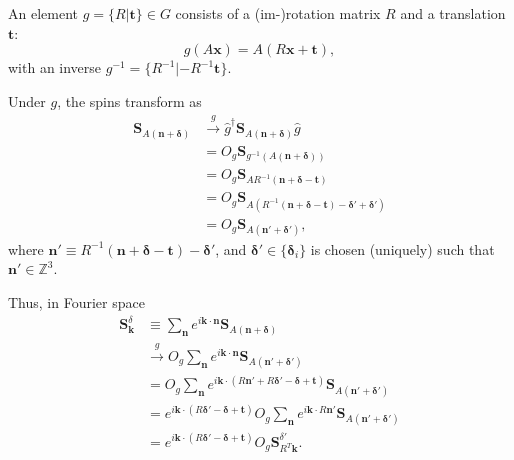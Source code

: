 \documentclass[12pt, a4paper]{article}
\begin{document}
An element $g=\{R|\bm{t}\}\in G$ consists of a (im-)\@proper rotation matrix $R$ and a translation $\bm{t}$:
\begin{equation}
  g(A\bm{x})=A(R\bm{x}+\bm{t}),
\end{equation}
with an inverse $g^{-1}=\{R^{-1}|-R^{-1}\bm{t}\}$.

Under $g$, the spins transform as
\begin{align*}
  \bm{S}_{A(\bm{n}+\bm{\delta})}&\xrightarrow{g}\hat{g}^{\dagger}\bm{S}_{A(\bm{n}+\bm{\delta})}\hat{g}\\
   &= O_{g}\bm{S}_{g^{-1}(A(\bm{n}+\bm{\delta}))}\\
   &= O_{g}\bm{S}_{AR^{-1}(\bm{n}+\bm{\delta}-\bm{t})}\\
   &= O_{g}\bm{S}_{A(R^{-1}(\bm{n}+\bm{\delta}-\bm{t})-\bm{\delta}'+\bm{\delta}')}\\
   &= O_{g}\bm{S}_{A(\bm{n}'+\bm{\delta}')},
\end{align*}
where $\bm{n}'\equiv R^{-1}(\bm{n}+\bm{\delta}-\bm{t})-\bm{\delta}'$, and $\bm{\delta}'\in\{\bm{\delta}_i\}$ is chosen (uniquely) such that $\bm{n}'\in\mathbb{Z}^{3}$.

Thus, in Fourier space
\begin{align*}
  \bm{S}_{\bm{k}}^{\delta}&\equiv\sum_{\bm{n}}e^{i\bm{k}\cdot\bm{n}}\bm{S}_{A(\bm{n}+\bm{\delta})}\\
   &\xrightarrow{g}O_g\sum_{\bm{n}}e^{i\bm{k}\cdot\bm{n}}\bm{S}_{A(\bm{n}'+\bm{\delta}')}\\
   &=O_g\sum_{\bm{n}}e^{i\bm{k}\cdot(R\bm{n}'+R\bm{\delta}'-\bm{\delta}+\bm{t})}\bm{S}_{A(\bm{n}'+\bm{\delta}')}\\
   &=e^{i\bm{k}\cdot(R\bm{\delta}'-\bm{\delta}+\bm{t})}O_g\sum_{\bm{n}}e^{i\bm{k}\cdot R\bm{n}'}\bm{S}_{A(\bm{n}'+\bm{\delta}')}\\
   &=e^{i\bm{k}\cdot(R\bm{\delta}'-\bm{\delta}+\bm{t})}O_g\bm{S}_{R^T\bm{k}}^{\delta'}.
\end{align*}
\end{document}
